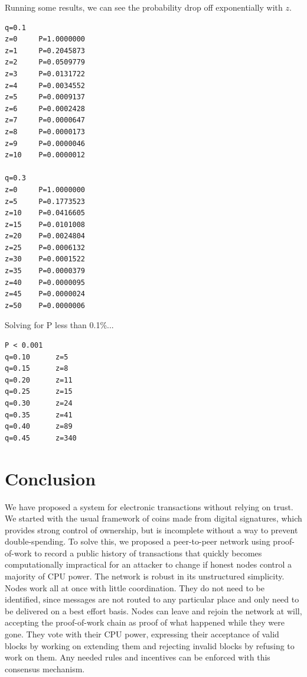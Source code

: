 \documentclass{article}
\begin{document}
Running some results, we can see the probability drop off exponentially with $z$.

\begin{verbatim}
q=0.1
z=0     P=1.0000000
z=1     P=0.2045873
z=2     P=0.0509779
z=3     P=0.0131722
z=4     P=0.0034552
z=5     P=0.0009137
z=6     P=0.0002428
z=7     P=0.0000647
z=8     P=0.0000173
z=9     P=0.0000046
z=10    P=0.0000012

q=0.3
z=0     P=1.0000000
z=5     P=0.1773523
z=10    P=0.0416605
z=15    P=0.0101008
z=20    P=0.0024804
z=25    P=0.0006132
z=30    P=0.0001522
z=35    P=0.0000379
z=40    P=0.0000095
z=45    P=0.0000024
z=50    P=0.0000006
\end{verbatim}

Solving for P less than 0.1\%...

\begin{verbatim}
P < 0.001
q=0.10      z=5
q=0.15      z=8
q=0.20      z=11
q=0.25      z=15
q=0.30      z=24
q=0.35      z=41
q=0.40      z=89
q=0.45      z=340
\end{verbatim}

\section{Conclusion}\label{sec:conclusion}
We have proposed a system for electronic transactions without relying on trust. We started with the usual framework of coins made from digital signatures, which provides strong control of ownership, but is incomplete without a way to prevent double-spending. To solve this, we proposed a peer-to-peer network using proof-of-work to record a public history of transactions that quickly becomes computationally impractical for an attacker to change if honest nodes control a majority of CPU power. The network is robust in its unstructured simplicity.  Nodes work all at once with little coordination. They do not need to be identified, since messages are not routed to any particular place and only need to be delivered on a best effort basis. Nodes can leave and rejoin the network at will, accepting the proof-of-work chain as proof of what happened while they were gone. They vote with their CPU power, expressing their acceptance of valid blocks by working on extending them and rejecting invalid blocks by refusing to work on them. Any needed rules and incentives can be enforced with this consensus mechanism.

\printbibliography
\end{document}
